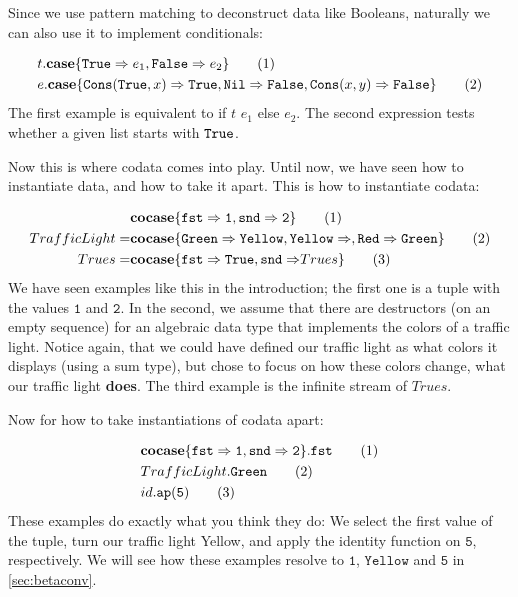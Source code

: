 \documentclass[twoside,12pt,a4paper]{article}
\begin{document}
Since we use pattern matching to deconstruct data like Booleans, naturally we can also use it to implement conditionals:
\begin{example}
    \begin{align*}
        &t.\textbf{case}\{\mathtt{True}\Rightarrow e_1, \mathtt{False}\Rightarrow e_2\} \tag{1}\\
        &e.\textbf{case}\{\mathtt{Cons(}\mathtt{True}, x\mathtt{)}\Rightarrow \mathtt{True}, 
        \mathtt{Nil\Rightarrow False}, \mathtt{Cons(}x, y\mathtt{)}\Rightarrow\mathtt{False}\}\tag{2}
    \end{align*}
The first example is equivalent to if $t$ $e_1$ else $e_2$. The second expression tests whether a given list starts with $\mathtt{True}$.
\end{example}

Now this is where codata comes into play. Until now, we have seen how to instantiate data, 
and how to take it apart. This is how to instantiate codata:

\begin{example}
    \begin{align*}
        &\textbf{cocase}\{\mathtt{fst\Rightarrow 1, snd\Rightarrow 2}\}\tag{1}\\
        TrafficLight =& \textbf{cocase}\{\mathtt{Green \Rightarrow Yellow, Yellow\Rightarrow, Red\Rightarrow Green}\}\tag{2}\\
        Trues =& \textbf{cocase}\{\mathtt{fst \Rightarrow True, snd\Rightarrow}Trues\}\tag{3} 
    \end{align*}
    We have seen examples like this in the introduction; the first one is a tuple with the values $\mathtt{1}$ and $\mathtt{2}$.
    In the second, we assume that there are destructors (on an empty sequence) for an algebraic data type that implements the colors of a traffic light.
    Notice again, that we could have defined our traffic light as what colors it displays (using a sum type), but chose to focus on how these colors change, 
    what our traffic light \textbf{does}.
    The third example is the infinite stream of $Trues$.
\end{example}

Now for how to take instantiations of codata apart:

\begin{example}
    \begin{align*}
        &\textbf{cocase}\{\mathtt{fst\Rightarrow 1, snd\Rightarrow 2}\}.\mathtt{fst}\tag{1}\\
        &TrafficLight.\mathtt{Green}\tag{2}\\
        &id.\texttt{ap}(\mathtt{5})\tag{3}
    \end{align*}
    These examples do exactly what you think they do: We select the first value of the tuple, turn our traffic light Yellow, 
    and apply the identity function on $\mathtt{5}$, respectively.
    We will see how these examples resolve to $\mathtt{1}$, $\mathtt{Yellow}$ and $\mathtt{5}$ in \ref{sec:betaconv}.
\end{example} 
\end{document}
